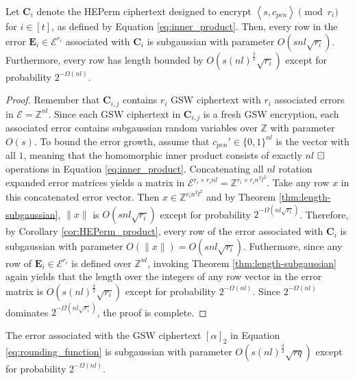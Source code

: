 \begin{lemma}\label{lemma:inner_product_error}
    Let $\mathbf{C}_i$ denote the HEPerm ciphertext designed to encrypt $\left \langle s, c_{pen} \right \rangle \pmod {r_i}$ for $i \in [t]$, as defined by Equation \ref{eq:inner_product}. Then, every row in the error $\mathbf{E}_i \in \mathcal{E}^{r_i}$ associated with $\mathbf{C}_i$ is subgaussian with parameter $O(snl\sqrt{r_i})$. Furthermore, every row has length bounded by $O(s(nl)^\frac{3}{2}\sqrt{r_i})$ except for probability $2^{-\Omega(nl)}$.
\end{lemma}
\begin{proof}
    Remember that $\mathbf{C}_{i,j}$ contains $r_i$ GSW ciphertext with $r_i$ associated errors in $\mathcal{E} = \mathbb{Z}^{nl}$. Since each GSW ciphertext in $\mathbf{C}_{i,j}$ is a fresh GSW encryption, each associated error contains subgaussian random variables over $\mathbb{Z}$ with parameter $O(s)$. To bound the error growth, assume that $c_{pen}' \in \{0,1\}^{nl}$ is the vector with all $1$, meaning that the homomorphic inner product consists of exactly $nl$ $\boxring$ operations in Equation \ref{eq:inner_product}. Concatenating all $nl$ rotation expanded error matrices yields a matrix in $\mathcal{E}^{r_i \times r_i n l} = \mathbb{Z}^{r_i \times r_i n^2l^2}$. Take any row $x$ in this concatenated error vector. Then $x \in \mathbb{Z}^{r_in^2l^2}$ and by Theorem \ref{thm:length-subgaussian}, $\|x\|$ is $O(s n l \sqrt{r_i})$ except for probability $2^{-\Omega(nl\sqrt{r_i})}$. Therefore, by Corollary \ref{cor:HEPerm_product}, every row of the error associated with $\mathbf{C}_i$ is subgaussian with parameter $O(\|x\|) = O(snl\sqrt{r_i})$. Futhermore, since any row of $\mathbf{E}_i \in \mathcal{E}^{r_i}$ is defined over $\mathbb{Z}^{n l}$, invoking Theorem \ref{thm:length-subgaussian} again yields that the length over the integers of any row vector in the error matrix is $O(s(nl)^\frac{3}{2}\sqrt{r_i})$ except for probability $2^{-\Omega(nl)}$. Since $2^{-\Omega(nl)}$ dominates $2^{-\Omega(nl\sqrt{r_i})}$, the proof is complete.
\end{proof}
\begin{theorem}
    The error associated with the GSW ciphertext $[\alpha]_2$ in Equation \ref{eq:rounding_function} is subgaussian with parameter $O(s(nl)^\frac{3}{2}\sqrt{rq})$ except for probability $2^{-\Omega(nl)}$. 
\end{theorem}
